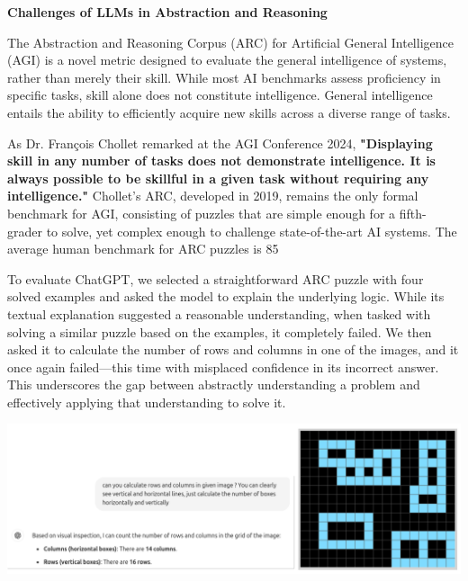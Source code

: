 \documentclass[11pt]{scrartcl}
\begin{document}
\begin{huge}
\textbf{Challenges of LLMs in Abstraction and Reasoning}
\end{huge}
The Abstraction and Reasoning Corpus (ARC) for Artificial General Intelligence (AGI) is a novel metric designed to evaluate the general intelligence of systems, rather than merely their skill. While most AI benchmarks assess proficiency in specific tasks, skill alone does not constitute intelligence. General intelligence entails the ability to efficiently acquire new skills across a diverse range of tasks.

As Dr. François Chollet remarked at the AGI Conference 2024\cite{ref9}, \textbf{"Displaying skill in any number of tasks does not demonstrate intelligence. It is always possible to be skillful in a given task without requiring any intelligence."} Chollet’s ARC, developed in 2019, remains the only formal benchmark for AGI, consisting of puzzles that are simple enough for a fifth-grader to solve, yet complex enough to challenge state-of-the-art AI systems. The average human benchmark for ARC puzzles is 85%

To evaluate ChatGPT, we selected a straightforward ARC puzzle with four solved examples and asked the model to explain the underlying logic. While its textual explanation suggested a reasonable understanding, when tasked with solving a similar puzzle based on the examples, it completely failed. We then asked it to calculate the number of rows and columns in one of the images, and it once again failed—this time with misplaced confidence in its incorrect answer. This underscores the gap between abstractly understanding a problem and effectively applying that understanding to solve it.

\vspace{1cm}

\includegraphics[width=0.99\linewidth, center]{arcagi_1.png}

\vspace{0.5cm}
\end{document}
